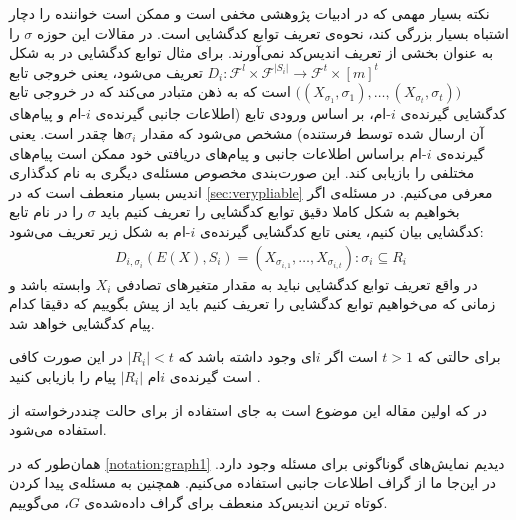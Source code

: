 \begin{remark}
	\label{remark:pliablevsvery}
	نکته بسیار مهمی که در ادبیات پژوهشی 
	\picod
	مخفی است و ممکن است خواننده را دچار اشتباه بسیار بزرگی کند، نحوه‌ی تعریف توابع کدگشایی است. در مقالات این حوزه
	$\sigma$
	را به عنوان بخشی از تعریف اندیس‌کد نمی‌آورند. برای مثال توابع کدگشایی در
	\cite{song2017polynomialtime}
	به شکل
	$D_i: \mathcal{F}^l \times \mathcal{F}^{|S_i|} \rightarrow \mathcal{F}^t \times [m]^t$
	تعریف می‌شود، یعنی خروجی تابع
	$\big((X_{\sigma_1}, \sigma_1), \ldots, (X_{\sigma_t}, \sigma_t) \big)$
	است که به ذهن متبادر می‌کند که در خروجی تابع کدگشایی گیرنده‌ی 
	$i$-ام،
	 بر اساس ورودی تابع (اطلاعات جانبی گیرنده‌ی 
	$i$-ام
	و پیام‌های آن ارسال شده توسط فرستنده) مشخص می‌شود که مقدار
	$\sigma_i$ها 
 چقدر است. یعنی گیرنده‌ی
	$i$-ام
	 براساس اطلاعات جانبی و پیام‌های دریافتی خود ممکن است پیام‌های مختلفی را بازیابی کند. این صورت‌بندی مخصوص مسئله‌ی دیگری به نام کدگذاری اندیس بسیار منعطف است که در
	\autoref{sec:verypliable}
	معرفی می‌کنیم. در مسئله‌ی
	\picod
	اگر بخواهیم به شکل کاملا دقیق توابع کدگشایی را تعریف کنیم باید 
	$\sigma$
	 را در نام تابع کدگشایی بیان کنیم، یعنی تابع کدگشایی گیرنده‌ی
	 $i$-ام
    به شکل زیر تعریف می‌شود:
	 	\begin{align}
	 	D_{i, \sigma_i}(E(X), S_i) = (X_{\sigma_{i,1}}, \ldots, X_{\sigma_{i,t}}): \sigma_i \subseteq R_i
	 	\end{align}
	 	در واقع تعریف توابع کدگشایی نباید به مقدار متغیرهای تصادفی
	 	$X_i$
	 	وابسته باشد و زمانی که می‌خواهیم توابع کدگشایی را تعریف کنیم باید از پیش بگوییم که دقیقا کدام پیام کدگشایی خواهد شد.
\end{remark}

\begin{note}
	برای حالتی که
	$t > 1$
	است اگر
	$i$ای وجود داشته باشد که
	$|R_i| < t$
	در این صورت کافی است گیرنده‌ی 
	$i$ام
	$|R_i|$
	پیام را بازیابی کنید \cite{pliablefirstpaper}.
\end{note}

\begin{note}
	در 
	\cite{pliablefirstpaper}
	که اولین مقاله این موضوع است به جای استفاده از
	\picodt
	برای حالت چنددرخواسته از
	استفاده می‌شود.
\end{note}
\begin{notation}
	همان‌طور که در
	\autoref{notation:graph1}
	دیدیم نمایش‌های گوناگونی برای مسئله وجود دارد. در این‌جا ما از گراف اطلاعات جانبی استفاده می‌کنیم. همچنین به مسئله‌ی پیدا کردن کوتاه ترین اندیس‌کد منعطف برای گراف داده‌شده‌ی 
	$G$،
	\picodg
	می‌گوییم.
\end{notation}

